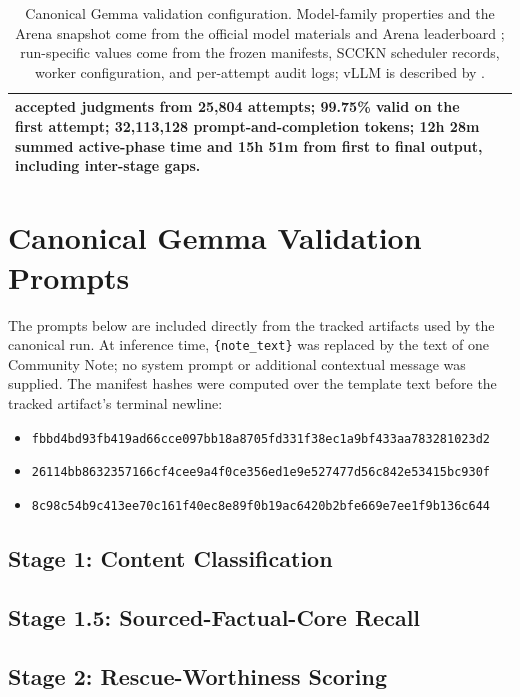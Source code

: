 \documentclass[10pt,twocolumn]{article}
\begin{document}
\begin{table}[ht]
\begin{tabularx}{\textwidth}{@{}p{2.7cm}>{\raggedright\arraybackslash}X@{}}
accepted judgments from 25,804 attempts; 99.75\% valid on the first attempt;
32,113,128 prompt-and-completion tokens; 12h 28m summed active-phase time and
15h 51m from first to final output, including inter-stage gaps. \\
\bottomrule
\end{tabularx}
\caption{Canonical Gemma validation configuration. Model-family properties and
the Arena snapshot come from the official model materials and Arena
leaderboard \citep{arena2026leaderboard,google2026gemma4,google2026gemma4card};
run-specific values come from the frozen manifests, SCCKN scheduler records,
worker configuration, and per-attempt audit logs; vLLM is described by
\citet{kwon2023vllm}.}
\label{tab:gemma-runtime}
\end{table}

\section{Canonical Gemma Validation Prompts}
\label{app:gemma-prompts}

The prompts below are included directly from the tracked artifacts used by the
canonical run. At inference time, \verb|{note_text}| was replaced by the
text of one Community Note; no system prompt or additional contextual message
was supplied. The manifest hashes were computed over the template text before
the tracked artifact's terminal newline:
\begin{itemize}[nosep,leftmargin=1.7cm]
  \item[Stage 1:] \texttt{fbbd4bd93fb419ad66cce097bb18a8705fd331f38ec1a9bf433aa783281023d2}
  \item[Stage 1.5:] \texttt{26114bb8632357166cf4cee9a4f0ce356ed1e9e527477d56c842e53415bc930f}
  \item[Stage 2:] \texttt{8c98c54b9c413ee70c161f40ec8e89f0b19ac6420b2bfe669e7ee1f9b136c644}
\end{itemize}

\subsection{Stage 1: Content Classification}

\subsection{Stage 1.5: Sourced-Factual-Core Recall}

\subsection{Stage 2: Rescue-Worthiness Scoring}
\end{document}
